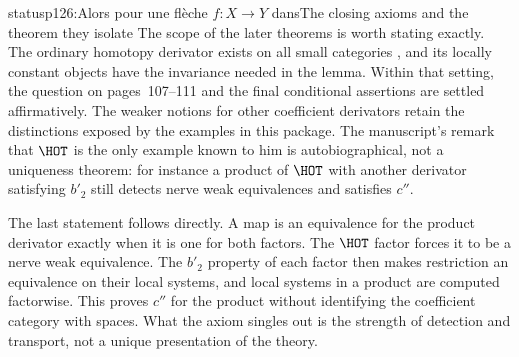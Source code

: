 \begin{dcomment}{status}{p126:Alors pour une flèche $f : X \to Y$ dans}{The closing axioms and the theorem they isolate}
The scope of the later theorems is worth stating exactly. The ordinary homotopy derivator exists on all small categories \citep[Theorem~6.11]{Cisinski2003}, and its locally constant objects have the invariance needed in the lemma. Within that setting, the question on pages~107--111 and the final conditional assertions are settled affirmatively. The weaker notions for other coefficient derivators retain the distinctions exposed by the examples in this package. The manuscript's remark that $\HOT$ is the only example known to him is autobiographical, not a uniqueness theorem: for instance a product of $\HOT$ with another derivator satisfying $b'_2$ still detects nerve weak equivalences and satisfies $c''$.

The last statement follows directly. A map is an equivalence for the product derivator exactly when it is one for both factors. The $\HOT$ factor forces it to be a nerve weak equivalence. The $b'_2$ property of each factor then makes restriction an equivalence on their local systems, and local systems in a product are computed factorwise. This proves $c''$ for the product without identifying the coefficient category with spaces. What the axiom singles out is the strength of detection and transport, not a unique presentation of the theory.
\end{dcomment}


